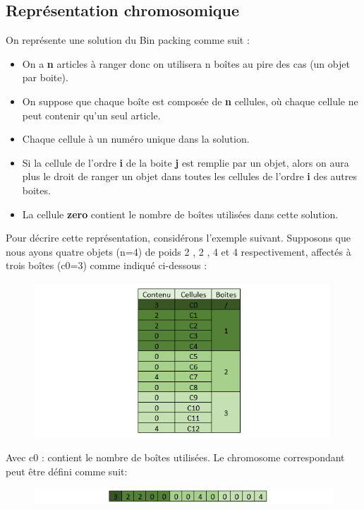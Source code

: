\documentclass{article}
\begin{document}
\subsection{Représentation chromosomique}
On représente une solution du Bin packing comme suit : 
\begin{itemize}
	\item On a \textbf{n} articles à ranger donc on utilisera n boîtes au pire des cas (un objet par boite).
	\item On suppose que chaque boîte est composée de \textbf{n} cellules, où chaque cellule ne peut contenir qu’un seul article.
	\item Chaque cellule à un numéro unique dans la solution.
	\item Si la cellule de l’ordre \textbf{i} de la boite \textbf{j} est remplie par un objet, alors on aura plus le droit de ranger un objet dans toutes les cellules de l’ordre \textbf{i} des autres boites.
	\item La cellule \textbf{zero} contient le nombre de boîtes utilisées dans cette solution.
\end{itemize}
Pour décrire cette représentation, considérons l'exemple suivant. Supposons que nous ayons quatre objets (n=4) de poids 2 , 2 , 4 et 4 respectivement, affectés à trois boîtes  (c0=3)  comme indiqué ci-dessous :
\begin{figure}[H]
  \includegraphics[width=\linewidth]{../figures/pic01.PNG}
\end{figure}
Avec c0 : contient le nombre de boîtes utilisées.
\newline
Le chromosome correspondant peut être défini comme suit:
\begin{figure}[H]
  \includegraphics[width=\linewidth]{../figures/pic02.PNG}
\end{figure}
\end{document}
